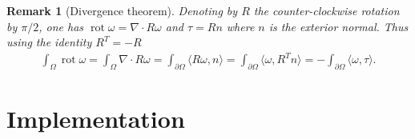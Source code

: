 \documentclass[11pt]{article}
\newtheorem{remark}[definition]{Remark}
\DeclareMathOperator\rot{rot}
\def\<{\langle} \def\>{\rangle}
\begin{document}
\begin{remark}[Divergence theorem]
Denoting by $R$ the counter-clockwise rotation by $\pi/2$, one has $\rot \omega = \nabla\cdot R \omega$ and $\tau = R n$ where $n$ is the exterior normal.
Thus using the identity $R^T = -R$
\begin{align*}
	\int_\Omega \rot \omega = \int_\Omega \nabla \cdot R \omega = \int_{\partial \Omega} \<R \omega , n\> = \int_{\partial \Omega} \<\omega, R^T n\> = -\int_{\partial \Omega} \<\omega,\tau\>.
\end{align*}
\end{remark}

\section{Implementation}

%
%
\end{document}
